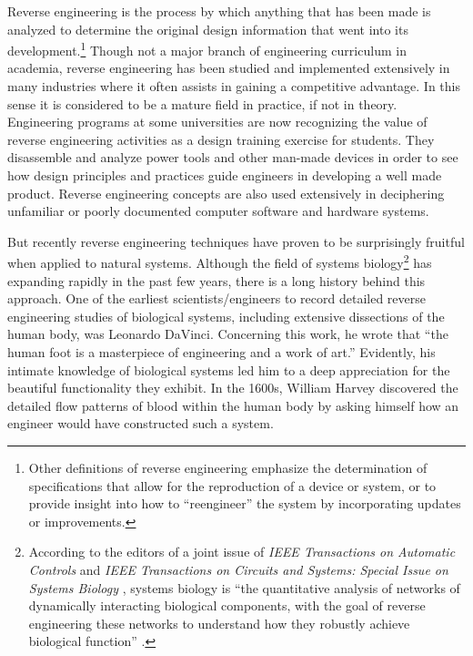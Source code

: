 Reverse engineering is the process by which anything that has been made
is analyzed to determine the original design information that went into
its development.\footnote{
Other definitions of reverse engineering emphasize
the determination of specifications that allow for the reproduction of
a device or system, or to provide insight into how to “reengineer” the
system by incorporating updates or improvements.
} Though not a major branch of
engineering curriculum in academia, reverse engineering has been
studied and implemented extensively in many industries where it often
assists in gaining a competitive advantage. In this sense it is
considered to be a mature field in practice, if not in theory.
Engineering programs at some universities are now recognizing the value
of reverse engineering activities as a design training exercise for
students.\citep[][pgs. 57--59]{wu2008}
They disassemble and analyze power tools
and other man-made devices in order to see how design principles and
practices guide engineers in developing a well made product. Reverse
engineering concepts are also used extensively in deciphering
unfamiliar or poorly documented computer software and hardware
systems.\citep{eilam2005}

But recently reverse engineering techniques have proven to be
surprisingly fruitful when applied to natural systems. Although the
field of systems biology\footnote{
According to the editors of a joint issue of
\textit{IEEE Transactions on Automatic Controls} and \textit{IEEE
Transactions on Circuits and Systems: Special Issue on Systems Biology
}, systems biology is “the quantitative analysis of
networks of dynamically interacting biological components, with the
goal of reverse engineering these networks to understand how they
robustly achieve biological function” \citep[][pg. 4]{joint2008}.
} has expanding rapidly in
the past few years, there is a long history behind this approach. One
of the earliest scientists/engineers to record detailed reverse
engineering studies of biological systems, including extensive
dissections of the human body, was Leonardo DaVinci. Concerning this
work, he wrote that “the human foot is a masterpiece of engineering and
a work of art.” Evidently, his intimate knowledge of biological systems
led him to a deep appreciation for the beautiful functionality they
exhibit. In the 1600s, William Harvey discovered the detailed flow
patterns of blood within the human body by asking himself how an
engineer would have constructed such a system.\citep{auffraynoble2009}

